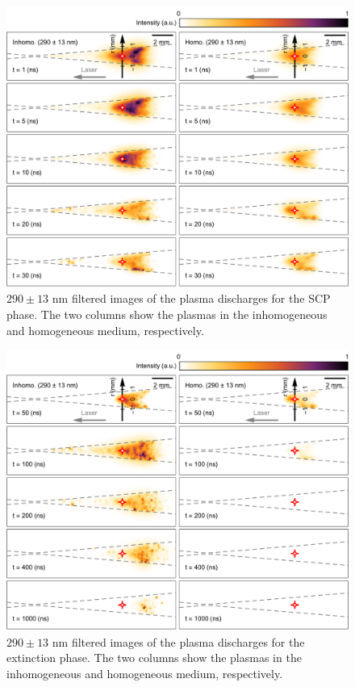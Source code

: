\begin{figure}[ht!]
\centering
\includegraphics[width=130mm]{figures/ch4/imaging/290SCP.pdf}
\caption{$290\pm13 \text{ nm}$ filtered images of the plasma discharges for the SCP phase. The two columns show the plasmas in the inhomogeneous and homogeneous medium, respectively.}
\label{fig:290SCP}
\end{figure}

\begin{figure}[ht!]
\centering
\includegraphics[width=130mm]{figures/ch4/imaging/290ext.pdf}
\caption{$290\pm13 \text{ nm}$ filtered images of the plasma discharges for the extinction phase. The two columns show the plasmas in the inhomogeneous and homogeneous medium, respectively.}
\label{fig:290ext0ext}
\end{figure}

